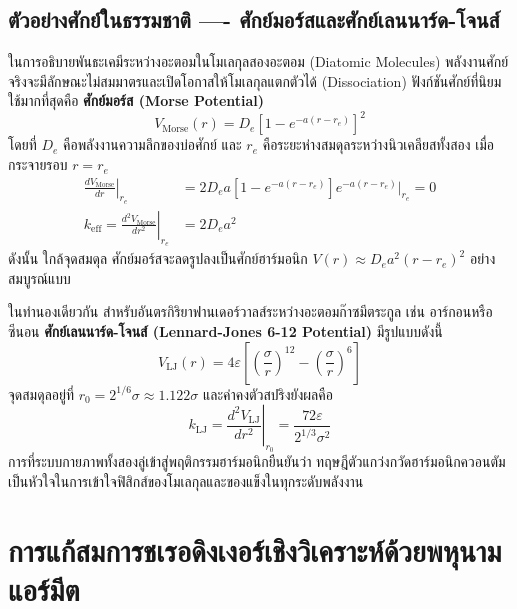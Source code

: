 \subsection{ตัวอย่างศักย์ในธรรมชาติ ---- ศักย์มอร์สและศักย์เลนนาร์ด-โจนส์}
ในการอธิบายพันธะเคมีระหว่างอะตอมในโมเลกุลสองอะตอม (Diatomic Molecules) พลังงานศักย์จริงจะมีลักษณะไม่สมมาตรและเปิดโอกาสให้โมเลกุลแตกตัวได้ (Dissociation) ฟังก์ชันศักย์ที่นิยมใช้มากที่สุดคือ \textbf{ศักย์มอร์ส (Morse Potential)}
\begin{equation}
V_{\text{Morse}}(r) = D_e \left[ 1 - e^{-a(r - r_e)} \right]^2
\end{equation}
โดยที่ $D_e$ คือพลังงานความลึกของบ่อศักย์ และ $r_e$ คือระยะห่างสมดุลระหว่างนิวเคลียสทั้งสอง เมื่อกระจายรอบ $r = r_e$
\begin{align}
\left. \frac{dV_{\text{Morse}}}{dr} \right|_{r_e} &= 2 D_e a \left[ 1 - e^{-a(r - r_e)} \right] e^{-a(r - r_e)} \Big|_{r_e} = 0 \\
k_{\text{eff}} = \left. \frac{d^2V_{\text{Morse}}}{dr^2} \right|_{r_e} &= 2 D_e a^2
\end{align}
ดังนั้น ใกล้จุดสมดุล ศักย์มอร์สจะลดรูปลงเป็นศักย์ฮาร์มอนิก $V(r) \approx D_e a^2 (r - r_e)^2$ อย่างสมบูรณ์แบบ

ในทำนองเดียวกัน สำหรับอันตรกิริยาฟานเดอร์วาลส์ระหว่างอะตอมก๊าซมีตระกูล เช่น อาร์กอนหรือซีนอน \textbf{ศักย์เลนนาร์ด-โจนส์ (Lennard-Jones 6-12 Potential)} มีรูปแบบดังนี้
\begin{equation}
V_{\text{LJ}}(r) = 4\varepsilon \left[ \left(\frac{\sigma}{r}\right)^{12} - \left(\frac{\sigma}{r}\right)^6 \right]
\end{equation}
จุดสมดุลอยู่ที่ $r_0 = 2^{1/6}\sigma \approx 1.122\sigma$ และค่าคงตัวสปริงยังผลคือ
\begin{equation}
k_{\text{LJ}} = \left. \frac{d^2V_{\text{LJ}}}{dr^2} \right|_{r_0} = \frac{72\varepsilon}{2^{1/3}\sigma^2}
\end{equation}
การที่ระบบกายภาพทั้งสองลู่เข้าสู่พฤติกรรมฮาร์มอนิกยืนยันว่า ทฤษฎีตัวแกว่งกวัดฮาร์มอนิกควอนตัมเป็นหัวใจในการเข้าใจฟิสิกส์ของโมเลกุลและของแข็งในทุกระดับพลังงาน

\section{การแก้สมการชเรอดิงเงอร์เชิงวิเคราะห์ด้วยพหุนามแอร์มีต}
\label{sec_hermite_analytic_solution}

